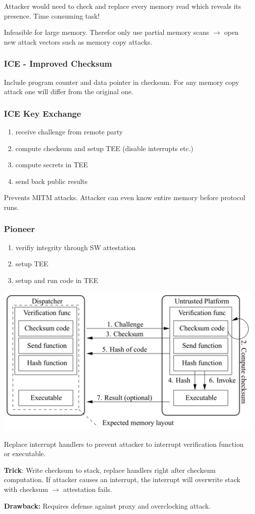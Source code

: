 Attacker would need to check and replace every memory read which reveals its presence. Time consuming task!

Infeasible for large memory. Therefor only use partial memory scans $\xrightarrow{}$ open new attack vectors such as memory copy attacks.

\subsubsection{ICE - Improved Checksum}
Include program counter and data pointer in checksum. For any memory copy attack one will differ from the original one.

\subsubsection{ICE Key Exchange}
\begin{enumerate}
    \item receive challenge from remote party
    \item compute checksum and setup TEE (disable interrupts etc.)
    \item compute secrets in TEE
    \item send back public results
\end{enumerate}

Prevents MITM attacks. Attacker can even know entire memory before protocol runs.

\subsubsection{Pioneer}
\begin{enumerate}
    \item verifiy integrity through SW attestation
    \item setup TEE
    \item setup and run code in TEE
\end{enumerate}
\begin{center}
    \includegraphics[width=0.8\linewidth]{images/software_attestation-pioneer.png}
\end{center}

Replace interrupt handlers to prevent attacker to interrupt verification function or executable.

\textbf{Trick}: Write checksum to stack, replace handlers right after checksum computation. If attacker causes an interrupt, the interrupt will overwrite stack with checksum $\xrightarrow{}$ attestation fails.

\textbf{Drawback:} Requires defense against proxy and overclocking attack.
